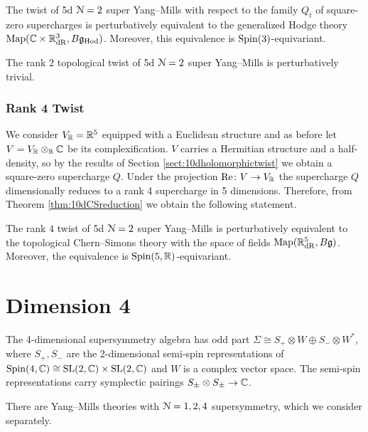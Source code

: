 \documentclass[10pt, oneside]{article}
\newcommand{\Hod}{\mathrm{Hod}}
\renewcommand{\Re}{\mathrm{Re}}
\begin{document}
\begin{theorem}
The twist of 5d $\mathcal N=2$ super Yang--Mills with respect to the family $Q_t$ of square-zero supercharges is perturbatively equivalent to the generalized Hodge theory $\map(\CC\times \RR^3_{\mathrm{dR}}, B\fg_{\Hod})$. Moreover, this equivalence is $\mathrm{Spin}(3)$-equivariant.
\label{thm:5dHodgetwist}
\end{theorem}

\begin{corollary}
The rank 2 topological twist of 5d $\mathcal N=2$ super Yang--Mills is perturbatively trivial.
\label{cor:5drank2topologicaltwist}
\end{corollary}

\subsubsection{Rank 4 Twist}
\label{sect:5drank4twist}

We consider $V_\mathbb R=\mathbb R^5$ equipped with a Euclidean structure and as before let $V=V_\mathbb R\otimes_\mathbb R\mathbb C$ be its complexification. $V$ carries a Hermitian structure and a half-density, so by the results of Section \ref{sect:10dholomorphictwist} we obtain a square-zero supercharge $Q$. Under the projection $\Re\colon V\rightarrow V_\RR$ the supercharge $Q$ dimensionally reduces to a rank 4 supercharge in 5 dimensions. Therefore, from Theorem \ref{thm:10dCSreduction} we obtain the following statement.

\begin{theorem}
The rank $4$ twist of 5d $\mathcal N=2$ super Yang--Mills is perturbatively equivalent to the topological Chern--Simons theory with the space of fields $\operatorname{Map}(\mathbb R^5_{\mathrm{dR}}, B\mathfrak g)$. Moreover, the equivalence is $\mathrm{Spin}(5, \mathbb R)$-equivariant.
\end{theorem}
 
\section{Dimension 4}

The 4-dimensional supersymmetry algebra has odd part $\Sigma\cong S_+\otimes W\oplus S_-\otimes W^*$, where $S_+, S_-$ are the 2-dimensional semi-spin representations of $\mathrm{Spin}(4, \mathbb C)\cong \mathrm{SL}(2, \mathbb C) \times \mathrm{SL}(2, \mathbb C)$ and $W$ is a complex vector space. The semi-spin representations carry symplectic pairings $S_\pm\otimes S_\pm\rightarrow \mathbb C$.

There are Yang--Mills theories with $\mathcal N=1,2,4$ supersymmetry, which we consider separately.
\end{document}
